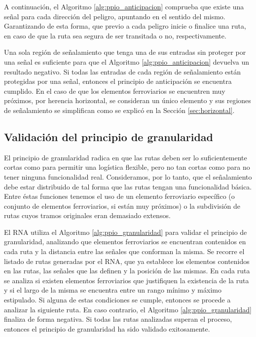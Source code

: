 		A continuación, el Algoritmo \ref{alg:ppio_anticipacion} comprueba que existe una señal para cada dirección del peligro, apuntando en el sentido del mismo. Garantizando de esta forma, que previo a cada peligro inicie o finalice una ruta, en caso de que la ruta sea segura de ser transitada o no, respectivamente.
		
		Una sola región de señalamiento que tenga una de sus entradas sin proteger por una señal es suficiente para que el Algoritmo \ref{alg:ppio_anticipacion} devuelva un resultado negativo. Si todas las entradas de cada región de señalamiento están protegidas por una señal, entonces el principio de anticipación se encuentra cumplido. En el caso de que los elementos ferroviarios se encuentren muy próximos, por herencia horizontal, se consideran un único elemento y sus regiones de señalamiento se simplifican como se explicó en la Sección \ref{sec:horizontal}.
		
	\subsection{Validación del principio de granularidad}
		
		El principio de granularidad radica en que las rutas deben ser lo suficientemente cortas como para permitir una logística flexible, pero no tan cortas como para no tener ninguna funcionalidad real. Consideramos, por lo tanto, que el señalamiento debe estar distribuido de tal forma que las rutas tengan una funcionalidad básica. Entre éstas funciones tenemos el uso de un elemento ferroviario específico (o conjunto de elementos ferroviarios, si están muy próximos) o la subdivisión de rutas cuyos tramos originales eran demasiado extensos.
		
		El RNA utiliza el Algoritmo \ref{alg:ppio_granularidad} para validar el principio de granularidad, analizando que elementos ferroviarios se encuentran contenidos en cada ruta y la distancia entre las señales que conforman la misma. Se recorre el listado de rutas generadas por el RNA, que ya establece los elementos contenidos en las rutas, las señales que las definen y la posición de las mismas. En cada ruta se analiza si existen elementos ferroviarios que justifiquen la existencia de la ruta y si el largo de la misma se encuentra entre un rango mínimo y máximo estipulado. Si alguna de estas condiciones se cumple, entonces se procede a analizar la siguiente ruta. En caso contrario, el Algoritmo \ref{alg:ppio_granularidad} finaliza de forma negativa. Si todas las rutas analizadas superan el proceso, entonces el principio de granularidad ha sido validado exitosamente.
		
